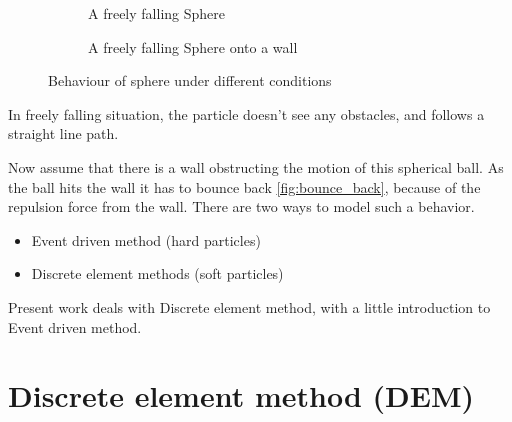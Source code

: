 \begin{figure}[htb]
  \centering

  \begin{subfigure}{.5\textwidth}
    \centering
    \caption{A freely falling Sphere}
    \label{fig:free_fall}
  \end{subfigure}%

  \begin{subfigure}{.5\textwidth}
    \centering
    \caption{A freely falling Sphere onto a wall}
    \label{fig:bounce_back}
  \end{subfigure}

  \caption{Behaviour of sphere under different conditions}
  \label{fig:sphere_intro}
\end{figure}

In freely falling situation, the particle doesn't see any obstacles,
and follows a straight line path.

Now assume that there is a wall obstructing the motion of this
spherical ball.  As the ball hits the wall it has to bounce back
\eqref{fig:bounce_back}, because of the repulsion force from the
wall. There are two ways to model such a behavior.

\begin{itemize}
\item Event driven method (hard particles)
\item Discrete element methods (soft particles)
\end{itemize}


Present work deals with Discrete element method, with a little introduction
to Event driven method.

\section{Discrete element method (DEM)}
\label{sec:edm}

